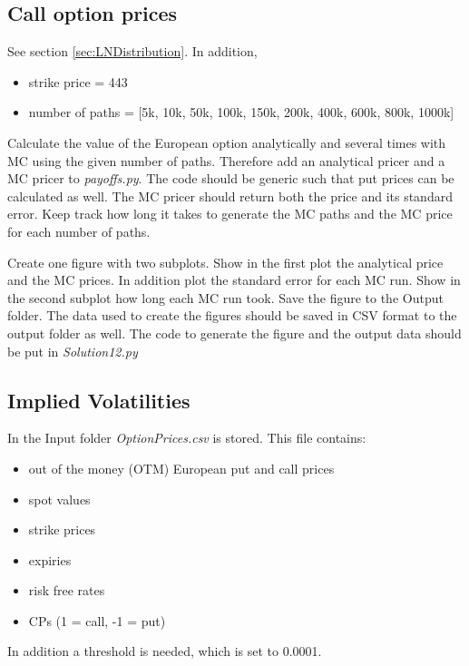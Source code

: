 \documentclass{article}
\begin{document}
\subsection{Call option prices}
\begin{info} %
See section \ref{sec:LNDistribution}. In addition,
    \begin{itemize}
      \item strike price  = 443
      \item number of paths = [5k, 10k, 50k, 100k, 150k, 200k, 400k, 600k, 800k, 1000k]
    \end{itemize}
\end{info}

Calculate the value of the European option analytically and several times with MC using the given number of paths. 
Therefore add an analytical pricer and a MC pricer to \textit{payoffs.py}. 
The code should be generic such that put prices can be calculated as well. 
The MC pricer should return both the price and its standard error. 
Keep track how long it takes to generate the MC paths and the MC price for each number of paths.

\begin{warn}[Deliverable 03:]
  Create one figure with two subplots. Show in the first plot the analytical price and the MC prices. 
  In addition plot the standard error for each MC run. 
  Show in the second subplot how long each MC run took. 
  Save the figure to the Output folder. 
  The data used to create the figures should be saved in CSV format to the output folder as well. 
  The code to generate the figure and the output data should be put in \textit{Solution12.py}
\end{warn}

\newpage

\subsection{Implied Volatilities}
\begin{info} %
In the Input folder \textit{OptionPrices.csv} is stored. This file contains:
    \begin{itemize}
      \item out of the money (OTM) European put and call prices
      \item spot values
      \item strike prices
      \item expiries
      \item risk free rates
      \item CPs (1 = call, -1 = put)
    \end{itemize}
In addition a threshold is needed, which is set to 0.0001.
\end{info}
\end{document}
